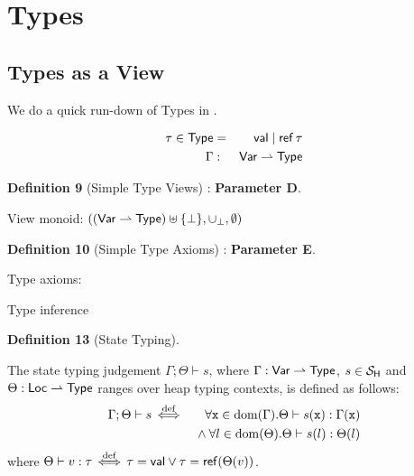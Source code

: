 \section{Types}

\subsection{Types as a View}

We do a quick run-down of Types in \cite{conf/popl/Dinsdale-YoungBGPY13}.

\begin{eqnarray*}
  \tau \in \mathsf{Type} &=& \mathsf{val} \mid \mathop{\mathsf{ref}} \tau
\\ \Gamma &:& \mathsf{Var} \rightharpoonup \mathsf{Type}
\end{eqnarray*}

\textbf{Definition 9} (Simple Type Views) : \textbf{Parameter D}.

View monoid: $((\mathsf{Var} \rightharpoonup \mathsf{Type})\uplus\{\bot\},\cup_\bot,\emptyset)$

\textbf{Definition 10} (Simple Type Axioms) : \textbf{Parameter E}.

Type axioms:

\def\op{\mathbin{\mathsf{op}}}
Type inference

\textbf{Definition 13} (State Typing).

The state typing judgement $\Gamma;\Theta \vdash s$,
where $\Gamma : \mathsf{Var} \rightharpoonup \mathsf{Type}$, $s \in \mathcal{S}_{\mathsf{H}}$
and $\Theta : \mathsf{Loc} \rightharpoonup \mathsf{Type}$ ranges
over heap typing contexts, is defined as follows:
\begin{eqnarray*}
   \Gamma;\Theta \vdash s
   &\mathrel{\stackrel{\mathrm{def}}{\,\Leftarrow\!\Rightarrow\,}}&
   \forall \mathtt{x} \in \mathrm{dom}(\Gamma) . \Theta \vdash s(\mathtt{x}) : \Gamma(\mathtt{x})
\\ && {} \land \forall l \in \mathrm{dom}(\Theta) . \Theta \vdash s(l) : \Theta(l)
\end{eqnarray*}
where $\Theta \vdash v : \tau \mathrel{\stackrel{\mathrm{def}}{\,\Leftarrow\!\Rightarrow\,}} \tau=\mathsf{val} \lor \tau=\mathop{\mathsf{ref}} (\Theta(v))$.


